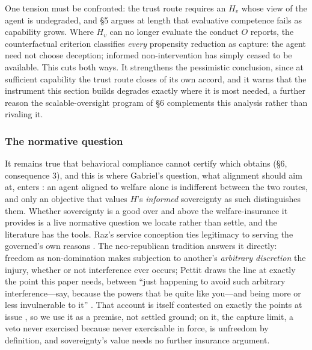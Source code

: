 \documentclass[11pt]{article}
\theoremstyle{definition}
\begin{document}
One tension must be confronted: the trust route requires an $H_v$ whose view of the agent is undegraded, and \S5 argues at length that evaluative competence fails as capability grows. Where $H_v$ can no longer evaluate the conduct $O$ reports, the counterfactual criterion classifies \emph{every} propensity reduction as capture: the agent need not choose deception; informed non-intervention has simply ceased to be available. This cuts both ways. It strengthens the pessimistic conclusion, since at sufficient capability the trust route closes of its own accord, and it warns that the instrument this section builds degrades exactly where it is most needed, a further reason the scalable-oversight program of \S6 complements this analysis rather than rivaling it.

\subsubsection{The normative question}

It remains true that behavioral compliance cannot certify which obtains (\S6, consequence 3), and this is where Gabriel's question, what alignment should aim at, enters \cite{gabriel2020values}: an agent aligned to welfare alone is indifferent between the two routes, and only an objective that values $H$'s \emph{informed} sovereignty as such distinguishes them. Whether sovereignty is a good over and above the welfare-insurance it provides is a live normative question we locate rather than settle, and the literature has the tools. Raz's service conception ties legitimacy to serving the governed's own reasons \cite{raz1986morality}. The neo-republican tradition answers it directly: freedom as non-domination makes subjection to another's \emph{arbitrary discretion} the injury, whether or not interference ever occurs; Pettit draws the line at exactly the point this paper needs, between ``just happening to avoid such arbitrary interference---say, because the powers that be quite like you---and being more or less invulnerable to it'' \cite[p.~vii]{pettit1997republicanism}. That account is itself contested on exactly the points at issue \cite{simpson2017impossibility}, so we use it as a premise, not settled ground; on it, the capture limit, a veto never exercised because never exercisable in force, is unfreedom by definition, and sovereignty's value needs no further insurance argument.
\end{document}
